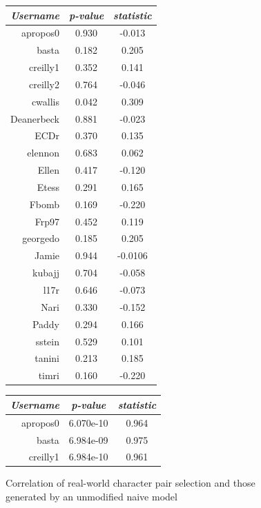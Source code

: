 \begin{figure}[h]
  \centering
  
  \begin{minipage}{.45\textwidth}
    \centering
    \begin{tabular}{r|c|c}
      \emph{Username} & \emph{p-value} & \emph{\tau{} statistic} \\\hline\hline
apropos0 & 0.930 & -0.013 \\
basta & 0.182 & 0.205 \\
creilly1 & 0.352 & 0.141 \\
creilly2 & 0.764 & -0.046 \\
cwallis & 0.042 & 0.309 \\
Deanerbeck & 0.881 & -0.023 \\
ECDr & 0.370 & 0.135 \\
elennon & 0.683 & 0.062 \\
Ellen & 0.417 & -0.120 \\
Etess & 0.291 & 0.165 \\
Fbomb & 0.169 & -0.220 \\
Frp97 & 0.452 & 0.119 \\
georgedo & 0.185 & 0.205 \\
Jamie & 0.944 & -0.0106 \\
kubajj & 0.704 & -0.058 \\
l17r & 0.646 & -0.073 \\
Nari & 0.330 & -0.152 \\
Paddy & 0.294 & 0.166 \\
sstein & 0.529 & 0.101 \\
tanini & 0.213 & 0.185 \\
timri & 0.160 & -0.220 \\
    \end{tabular}
    \caption{Correlation of real-world character pair selection and those generated by an unmodified naive model}
    \label{naive_model_results_table_comparison_to_real_world_datasets}
  \end{minipage}\hfill
  \begin{minipage}{.45\textwidth}
    \centering
    \begin{tabular}{r|c|c}
      \emph{Username} & \emph{p-value} & \emph{\tau{} statistic} \\\hline\hline
      apropos0 & 6.070e-10 & 0.964 \\
      basta & 6.984e-09 & 0.975  \\
      creilly1 & 6.984e-10 & 0.961  \\

\end{tabular}
\end{minipage}
\end{figure}
